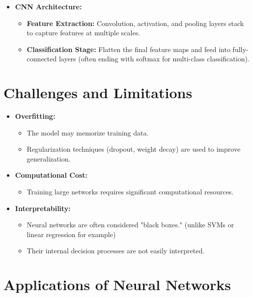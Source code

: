 \documentclass{article}
\begin{document}
\begin{itemize}
        \item \textbf{CNN Architecture:}
        \begin{itemize}
            \item \textbf{Feature Extraction:} Convolution, activation, and pooling layers stack to capture features at multiple scales.
            \item \textbf{Classification Stage:} Flatten the final feature maps and feed into fully-connected layers (often ending with softmax for multi-class classification).
        \end{itemize}
    \end{itemize}

\section{Challenges and Limitations}

\begin{itemize}
    \item \textbf{Overfitting:}
    \begin{itemize}
        \item The model may memorize training data.
        \item Regularization techniques (dropout, weight decay) are used to improve generalization.
    \end{itemize}
    
    \item \textbf{Computational Cost:}
    \begin{itemize}
        \item Training large networks requires significant computational resources.
    \end{itemize}
    
    \item \textbf{Interpretability:}
    \begin{itemize}
        \item Neural networks are often considered "black boxes." (unlike SVMs or linear regression for example)
        \item Their internal decision processes are not easily interpreted.
    \end{itemize}
\end{itemize}

\section{Applications of Neural Networks}
\end{document}

